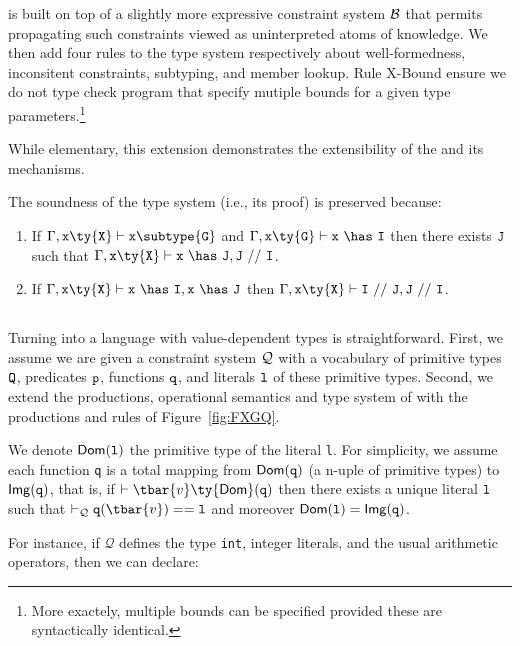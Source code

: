 is built on top of a slightly more expressive constraint system $\cal B$ that permits propagating such constraints viewed as uninterpreted atoms of knowledge. We then add four rules to the type system respectively about well-formedness, inconsitent constraints, subtyping, and member lookup. Rule {\sc X-Bound} ensure we do not type check program that specify mutiple bounds for a given type parameters.\footnote{More exactely, multiple bounds can be specified provided these are syntactically identical.}

While elementary, this extension demonstrates the extensibility of the \FXGL{\cdot} and its mechanisms.

The soundness of the type system (i.e., its proof) is preserved because:
\begin{enumerate}
\item If $\Gamma,{\tt x}\ty{\tt X}\vdash{\tt x}\subtype{\tt G}$ and $\Gamma,{\tt x}\ty{\tt G}\vdash{\tt x}~\has~{\tt I}$ then there exists $\tt J$ such that $\Gamma,{\tt x}\ty{\tt X}\vdash{\tt x}~\has~{\tt J}, {\tt J} ~//~ {\tt I}$.
\item
If $\Gamma,{\tt x}\ty{\tt X}\vdash{\tt x}~\has~{\tt I},{\tt x}~\has~{\tt J}$ then $\Gamma,{\tt x}\ty{\tt X}\vdash {\tt I}~//~{\tt J},{\tt J}~//~{\tt I}$.
\end{enumerate}


\subsection{}

Turning \FXGL{\cdot} into a language with value-dependent types is straightforward.
First, we assume we are given a constraint system $\cal Q$ with a vocabulary of primitive types ${\tt Q}$,
predicates ${\tt p}$, functions ${\tt q}$, and literals ${\tt l}$ of these primitive types. Second, we extend the productions, operational semantics and type system of \FXGL{\cdot} with the productions and rules of Figure~\ref{fig:FXGQ}.


We denote ${\sf Dom}({\tt l})$ the primitive type of the literal {\tt l}. For simplicity, we assume each function {\tt q}
is a total mapping from ${\sf Dom}({\tt q})$ (a n-uple of primitive types) to ${\sf Img}({\tt q})$, that is, if $\vdash \tbar{v}\ty{\sf Dom}({\tt q})$ then there exists a unique literal $\tt l$ such that $\vdashQ {\tt q}(\tbar{v})=={\tt l}$ and moreover ${\sf Dom}({\tt l})={\sf Img}({\tt q})$.

For instance, if $\mathcal{Q}$ defines the type {\tt int}, integer literals, and the usual arithmetic operators, then we can declare:

